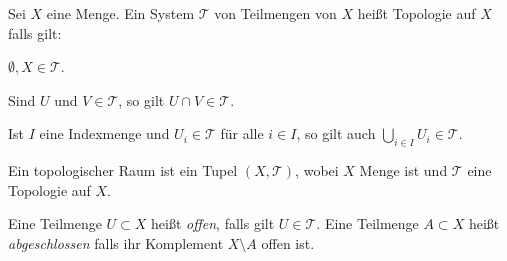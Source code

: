 \begin{definition}\label{topologie}
    Sei \( X \) eine Menge. Ein System \( \mathcal{T} \) von Teilmengen von \( X \) heißt Topologie auf \( X \) falls gilt: 
    \begin{eigenschaftenenumerate}
        
        \item\label{topologie:grundmengen} \( \emptyset,X\in \mathcal{T} \).
        \item\label{topologie:endlicher_schnitt} Sind \( U \) und \( V\in \mathcal{T} \), so gilt \( U\cap V \in \mathcal{T}\).
        \item\label{topologie:unendliche_vereinigung} Ist \( I \) eine Indexmenge und \( U_i \in \mathcal{T}  \) für alle \( i\in I \), so gilt auch \( \bigcup_{i\in I}U_i\in \mathcal{T} \).
    \end{eigenschaftenenumerate}
    
\end{definition}
\begin{notation*}
    Ein topologischer Raum ist ein Tupel \( (X,\mathcal{T}) \), wobei \(X\) Menge ist und \( \mathcal{T} \) eine Topologie auf \(X\).

    Eine Teilmenge \( U \subset X \) heißt \emph{offen}, falls gilt \(U \in \mathcal{T}\).
    Eine Teilmenge \(A \subset X\) heißt \emph{abgeschlossen} falls ihr Komplement \(X \setminus A\) offen ist.
        
    
\end{notation*}
